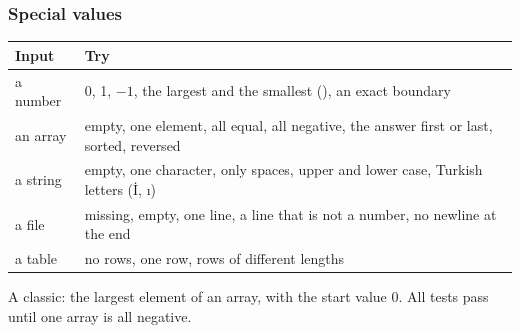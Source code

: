 \documentclass[aspectratio=169,10pt,compress]{beamer}
\begin{document}
\begin{frame}[t,fragile] \frametitle{Special values}


\begin{table}
		\small
		\begin{tabular}{@{}L{0.16\textwidth}L{0.76\textwidth}@{}}
			\toprule
			\textbf{Input} & \textbf{Try} \\
			\midrule
			a number  & 0, 1, $-1$, the largest and the smallest (), an exact boundary \\
			an array  & empty, one element, all equal, all negative, the answer first or last, sorted, reversed \\
			a string  & empty, one character, only spaces, upper and lower case, Turkish letters (İ, ı) \\
			a file    & missing, empty, one line, a line that is not a number, no newline at the end \\
			a table   & no rows, one row, rows of different lengths \\
			\bottomrule
		\end{tabular}
\end{table}%


	\vspace{0.5em}
	\small A classic: the largest element of an array, with the start value 0. All tests pass until one array
	is all negative.
\end{frame}
\end{document}
